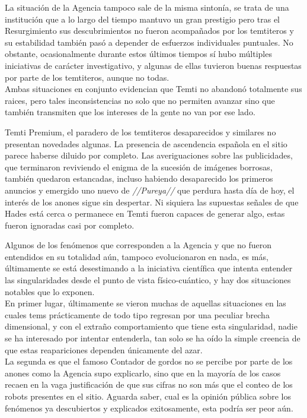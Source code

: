 \documentclass[
  spanish,
]{book}
\begin{document}
La situación de la Agencia tampoco sale de la misma sintonía, se trata de una institución que a lo largo del tiempo mantuvo un gran prestigio pero tras el Resurgimiento sus descubrimientos no fueron acompañados por los temtiteros y su estabilidad también pasó a depender de esfuerzos individuales puntuales. No obstante, ocasionalmente durante estos últimos tiempos sí hubo múltiples iniciativas de carácter investigativo, y algunas de ellas tuvieron buenas respuestas por parte de los temtiteros, aunque no todas.\\
Ambas situaciones en conjunto evidencian que Temti no abandonó totalmente sus raices, pero tales inconsistencias no solo que no permiten avanzar sino que también transmiten que los intereses de la gente no van por ese lado.

Temti Premium, el paradero de los temtiteros desaparecidos y similares no presentan novedades algunas. La presencia de ascendencia española en el sitio parece haberse diluido por completo. Las averiguaciones sobre las publicidades, que terminaron reviviendo el enigma de la sucesión de imágenes borrosas, también quedaron estancadas, incluso habiendo desaparecido los primeros anuncios y emergido uno nuevo de \emph{//Pureya//} que perdura hasta día de hoy, el interés de los anones sigue sin despertar. Ni siquiera las supuestas señales de que Hades está cerca o permanece en Temti fueron capaces de generar algo, estas fueron ignoradas casi por completo.

Algunos de los fenómenos que corresponden a la Agencia y que no fueron entendidos en su totalidad aún, tampoco evolucionaron en nada, es más, últimamente se está desestimando a la iniciativa científica que intenta entender las singularidades desde el punto de vista físico-cuántico, y hay dos situaciones notables que lo exponen.\\
En primer lugar, últimamente se vieron muchas de aquellas situaciones en las cuales tems prácticamente de todo tipo regresan por una peculiar brecha dimensional, y con el extraño comportamiento que tiene esta singularidad, nadie se ha interesado por intentar entenderla, tan solo se ha oído la simple creencia de que estas reapariciones dependen únicamente del azar.\\
La segunda es que el famoso Contador de gordos no se percibe por parte de los anones como la Agencia supo explicarlo, sino que en la mayoría de los casos recaen en la vaga justificación de que sus cifras no son más que el conteo de los robots presentes en el sitio. Aguarda saber, cual es la opinión pública sobre los fenómenos ya descubiertos y explicados exitosamente, esta podría ser peor aún.
\end{document}
